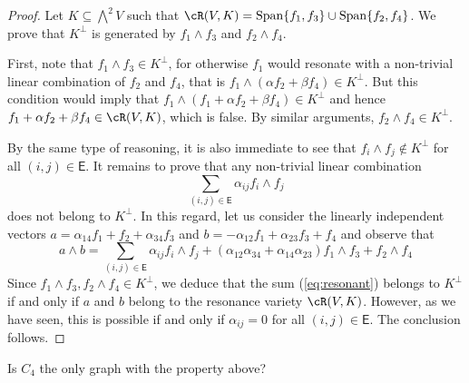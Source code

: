 \documentclass[10pt, leqno]{amsart}
\begin{document}
\begin{proof}
Let $K \subseteq \bigwedge^2V$ such that $\cR(V,K) = \operatorname{Span}\{f_1, f_3\} \cup \operatorname{Span}\{f_2, f_4 \}$. We prove that $K^\perp$ is generated by $f_1\wedge f_3$ and $f_2 \wedge f_4$.

First, note that $f_1 \wedge f_3 \in K^\perp$, for otherwise $f_1$ would resonate with a non-trivial linear combination of $f_2$ and $f_4$, that is $f_1 \wedge (\alpha f_2 + \beta f_4) \in K^\perp$. But this condition would imply that $f_1 \wedge (f_1 + \alpha f_2 + \beta f_4) \in K^\perp$ and hence $f_1 + \alpha f_2 + \beta f_4 \in \cR(V,K)$, which is false. By similar arguments, $f_2 \wedge f_4 \in K^\perp$.

By the same type of reasoning, it is also immediate to see that $f_i \wedge f_j \notin K^\perp$ for all $(i,j) \in \mathsf{E}$. It remains to prove that any non-trivial linear combination
\begin{equation} \label{eq:resonant}
    \sum_{(i,j) \in \mathsf{E}} \alpha_{ij} f_i \wedge f_j
\end{equation}
does not belong to $K^\perp$. In this regard, let us consider the linearly independent vectors $a = \alpha_{14} f_1 + f_2 + \alpha_{34} f_3$ and $b = -\alpha_{12} f_1 + \alpha_{23} f_3 + f_4$ and observe that
\[
a \wedge b = \sum_{(i,j) \in \mathsf{E}} \alpha_{ij} f_i \wedge f_j + (\alpha_{12}\alpha_{34} + \alpha_{14}\alpha_{23}) f_1 \wedge f_3 + f_2 \wedge f_4
\]
Since $f_1 \wedge f_3, f_2 \wedge f_4 \in K^\perp$, we deduce that the sum (\ref{eq:resonant}) belongs to $K^\perp$ if and only if $a$ and $b$ belong to the resonance variety $\cR(V,K)$. However, as we have seen, this is possible if and only if $\alpha_{ij} = 0$ for all $(i,j) \in \mathsf{E}$. The conclusion follows.
\end{proof}

\begin{ques}
Is $C_4$ the only graph with the property above?
\end{ques}

\printbibliography
\end{document}
